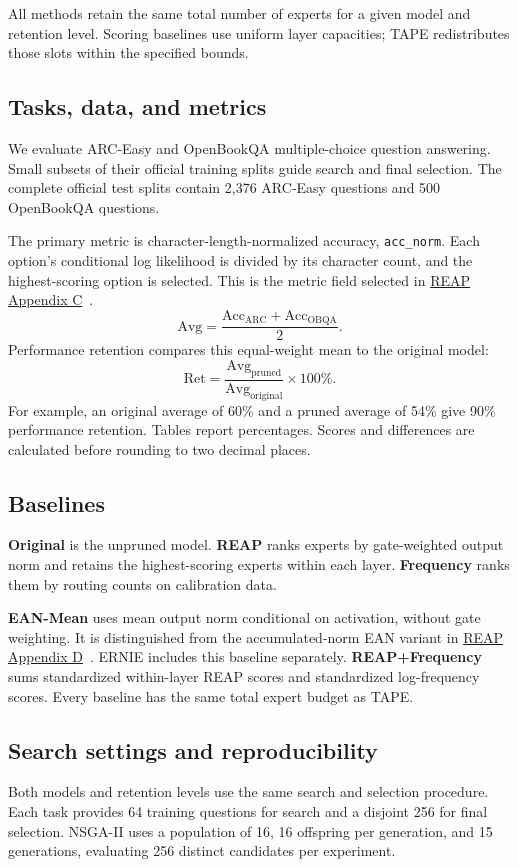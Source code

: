 \documentclass{article}
\begin{document}
All methods retain the same total number of experts for a given model and retention level. Scoring baselines use uniform layer capacities; TAPE redistributes those slots within the specified bounds.

\subsection{Tasks, data, and metrics}
\label{sec:4.2}
We evaluate ARC-Easy and OpenBookQA multiple-choice question answering. Small subsets of their official training splits guide search and final selection. The complete official test splits contain 2,376 ARC-Easy questions and 500 OpenBookQA questions.

The primary metric is character-length-normalized accuracy, \texttt{acc\_norm}. Each option's conditional log likelihood is divided by its character count, and the highest-scoring option is selected. This is the metric field selected in \href{https://arxiv.org/html/2510.13999v3#A3}{REAP Appendix C}~\citep{ref1}.
\[
\mathrm{Avg}=\frac{\mathrm{Acc}_{\mathrm{ARC}}+\mathrm{Acc}_{\mathrm{OBQA}}}{2}.
\]
Performance retention compares this equal-weight mean to the original model:
\[
\mathrm{Ret}=
\frac{\mathrm{Avg}_{\mathrm{pruned}}}{\mathrm{Avg}_{\mathrm{original}}}\times100\%.
\]
For example, an original average of 60\% and a pruned average of 54\% give 90\% performance retention. Tables report percentages. Scores and differences are calculated before rounding to two decimal places.

\subsection{Baselines}
\label{sec:4.3}
\textbf{Original} is the unpruned model. \textbf{REAP} ranks experts by gate-weighted output norm and retains the highest-scoring experts within each layer. \textbf{Frequency} ranks them by routing counts on calibration data.

\textbf{EAN-Mean} uses mean output norm conditional on activation, without gate weighting. It is distinguished from the accumulated-norm EAN variant in \href{https://arxiv.org/html/2510.13999v3#A4}{REAP Appendix D}~\citep{ref1}. ERNIE includes this baseline separately. \textbf{REAP+Frequency} sums standardized within-layer REAP scores and standardized log-frequency scores. Every baseline has the same total expert budget as TAPE.

\subsection{Search settings and reproducibility}
\label{sec:4.4}
Both models and retention levels use the same search and selection procedure. Each task provides 64 training questions for search and a disjoint 256 for final selection. NSGA-II uses a population of 16, 16 offspring per generation, and 15 generations, evaluating 256 distinct candidates per experiment.
\end{document}
